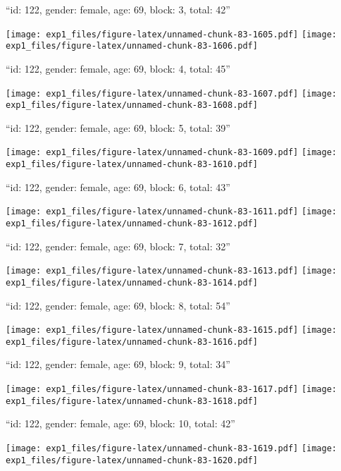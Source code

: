 \documentclass[11pt,,]{article}
\begin{document}
\newpage
[1] 

``id: 122, gender: female, age: 69, block: 3, total: 42''

\texttt{[image: exp1\_files/figure-latex/unnamed-chunk-83-1605.pdf]}
\texttt{[image: exp1\_files/figure-latex/unnamed-chunk-83-1606.pdf]}

\newpage
[1] 

``id: 122, gender: female, age: 69, block: 4, total: 45''

\texttt{[image: exp1\_files/figure-latex/unnamed-chunk-83-1607.pdf]}
\texttt{[image: exp1\_files/figure-latex/unnamed-chunk-83-1608.pdf]}

\newpage
[1] 

``id: 122, gender: female, age: 69, block: 5, total: 39''

\texttt{[image: exp1\_files/figure-latex/unnamed-chunk-83-1609.pdf]}
\texttt{[image: exp1\_files/figure-latex/unnamed-chunk-83-1610.pdf]}

\newpage
[1] 

``id: 122, gender: female, age: 69, block: 6, total: 43''

\texttt{[image: exp1\_files/figure-latex/unnamed-chunk-83-1611.pdf]}
\texttt{[image: exp1\_files/figure-latex/unnamed-chunk-83-1612.pdf]}

\newpage
[1] 

``id: 122, gender: female, age: 69, block: 7, total: 32''

\texttt{[image: exp1\_files/figure-latex/unnamed-chunk-83-1613.pdf]}
\texttt{[image: exp1\_files/figure-latex/unnamed-chunk-83-1614.pdf]}

\newpage
[1] 

``id: 122, gender: female, age: 69, block: 8, total: 54''

\texttt{[image: exp1\_files/figure-latex/unnamed-chunk-83-1615.pdf]}
\texttt{[image: exp1\_files/figure-latex/unnamed-chunk-83-1616.pdf]}

\newpage
[1] 

``id: 122, gender: female, age: 69, block: 9, total: 34''

\texttt{[image: exp1\_files/figure-latex/unnamed-chunk-83-1617.pdf]}
\texttt{[image: exp1\_files/figure-latex/unnamed-chunk-83-1618.pdf]}

\newpage
[1] 

``id: 122, gender: female, age: 69, block: 10, total: 42''

\texttt{[image: exp1\_files/figure-latex/unnamed-chunk-83-1619.pdf]}
\texttt{[image: exp1\_files/figure-latex/unnamed-chunk-83-1620.pdf]}
\end{document}
